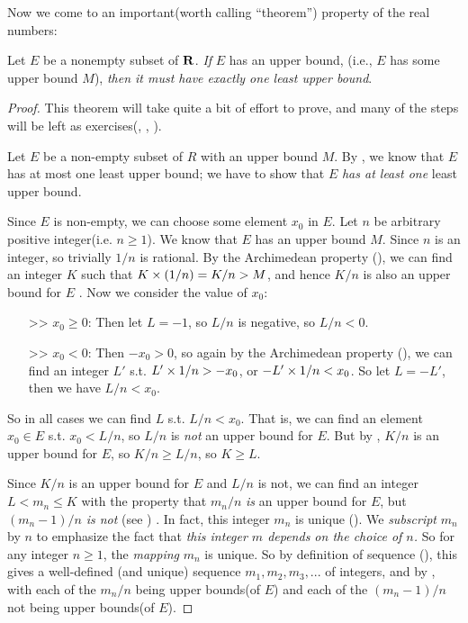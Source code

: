 Now we come to an important(worth calling ``theorem'') property of the real numbers:

\begin{theorem}  \label{thm 5.5.9}
Let \(E\) be a nonempty subset of \(\mathbf{R}\).
\emph{If} \(E\) has an upper bound, (i.e., \(E\) has some upper bound \(M\)), \emph{then it must have exactly one \emph{least} upper bound}.
\end{theorem}

\begin{proof}
This theorem will take quite a bit of effort to prove, and many of the steps will be left as exercises(, , ).

Let \(E\) be a non-empty subset of \(R\) with an upper bound \(M\).
By , we know that \(E\) has at most one least upper bound;
we have to show that \(E\) \emph{has at least one} least upper bound.

Since \(E\) is non-empty, we can choose some element \(x_0\) in \(E\).
Let \(n\) be arbitrary positive integer(i.e. \(n \ge 1\)).
We know that \(E\) has an upper bound \(M\).
Since \(n\) is an integer, so trivially \(1/n\) is rational.
By the Archimedean property (), we can find an integer \(K\) such that \(K \times (1/n) = K/n > M\), and hence \(K/n\) is also an upper bound for \(E\) .
Now we consider the value of \(x_0\):
\begin{itemize}
    \item [>>] \(x_0 \ge 0\):
        Then let \(L = -1\), so \(L/n\) is negative, so \(L/n < 0\).
    \item [>>] \(x_0 < 0\):
        Then \(-x_0 > 0\), so again by the Archimedean property (), we can find an integer \(L'\) s.t. \(L' \times 1/n > -x_0\), or \(-L' \times 1/n < x_0\).
        So let \(L = -L'\), then we have \(L/n < x_0\).
\end{itemize}
So in all cases we can find \(L\) s.t. \(L/n < x_0\).
That is, we can find an element \(x_0 \in E\) s.t. \(x_0 < L/n\), so \(L/n\) is \emph{not} an upper bound for \(E\).
But by , \(K/n\) is an upper bound for \(E\), so \(K/n \ge L/n\), so \(K \ge L\).

Since \(K/n\) is an upper bound for \(E\) and \(L/n\) is not, we can find an integer \(L < m_n \le K\) with the property that \(m_n/n\) \emph{is} an upper bound for \(E\), but \((m_n - 1)/n\) \emph{is not} (see ) .
In fact, this integer \(m_n\) is unique ().
We \emph{subscript} \(m_n\) by \(n\) to emphasize the fact that \emph{this integer \(m\) depends on the choice of \(n\).}
So for any integer \(n \ge 1\), the \emph{mapping} \(m_n\) is unique.
So by definition of sequence (), this gives a well-defined (and unique) sequence \(m_1, m_2, m_3,...\) of integers, and by ,
with each of the \(m_n/n\) being upper bounds(of \(E\)) and each of the \((m_n-1)/n\) not being upper bounds(of \(E\)).


\end{proof}
